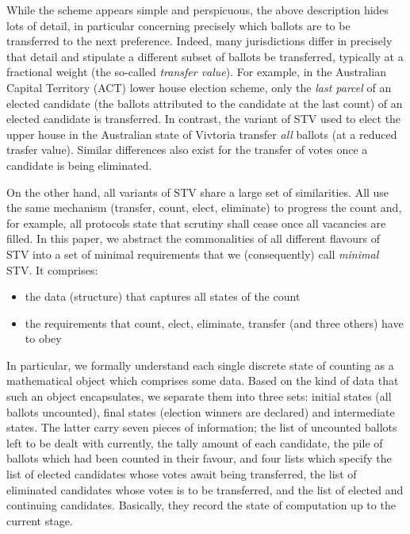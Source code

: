 \documentclass{llncs}
\begin{document}
\noindent
While the scheme appears simple and perspicuous, the above
description hides lots of detail, in particular concerning precisely
which ballots are to be transferred to the next preference.
Indeed, many jurisdictions differ in precisely that detail and
stipulate a different subset of ballots be transferred, typically at
a fractional weight (the so-called \emph{transfer value}). 
For example, in the Australian Capital Territory (ACT) lower house
election scheme, only the 
\emph{last parcel} of an elected candidate (the ballots attributed
to the candidate at the last
count)  of an elected candidate is transferred. In
contrast, the variant of STV used to elect the upper house in the
Australian state of Vivtoria transfer \emph{all} ballots (at a
reduced trasfer value). Similar differences also exist for the
transfer of votes once a candidate is being eliminated. 

On the other hand, all variants of STV share a large set of
similarities. All use the same mechanism (transfer, count, elect,
eliminate) to progress the count
and, 
for example, all protocols state that scrutiny shall cease once all
vacancies are filled. 
%
In this paper, we abstract the commonalities of all different
flavours of STV into a set of minimal requirements that we
(consequently) call 
\emph{minimal} STV. It comprises:
\begin{itemize}
\item the data (structure) that captures all states of the count
\item the requirements that count, elect, eliminate, transfer (and
three others) have to obey
\end{itemize}
\noindent
In particular, we formally understand each single
discrete state of counting as a mathematical object
which comprises some data. Based on the kind of data that such an
object encapsulates, we separate them into three sets: initial
states (all ballots uncounted), final states
(election winners are declared) and intermediate states. The latter
carry
seven pieces of information; the list of uncounted ballots left to
be dealt with currently, the tally amount of each candidate, the
pile of ballots which had been counted in their favour, and four
lists which specify the list of elected candidates whose votes await
being transferred, the list of eliminated candidates whose votes is
to be transferred, and the list of elected and continuing
candidates. Basically, they record the state of computation up to the
current stage. 
\end{document}
